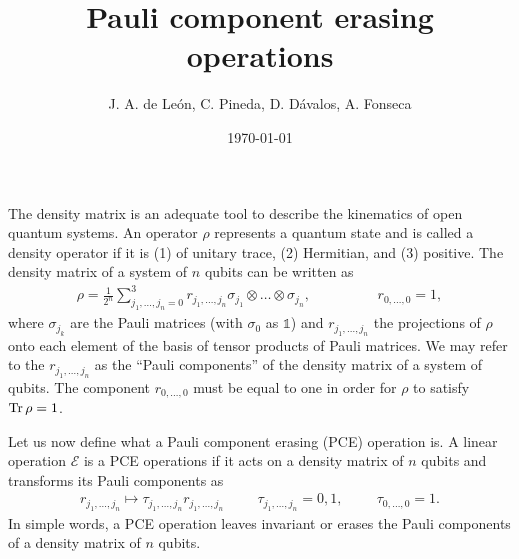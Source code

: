 \documentclass[11pt,dvipsnames]{article} %
\newcommand{\1}{\mathds{1}}
\begin{document}
\title{Pauli component erasing operations} 
\author{J. A. de León, C. Pineda, D. Dávalos, A. Fonseca}
\date{\today}  
\maketitle
{}

The density matrix is an adequate tool to describe the kinematics 
of open quantum systems. An operator $\rho$ represents a quantum state and
is called a density operator if it is (1) of unitary trace, (2) Hermitian, and 
(3) positive. The density matrix of a system of $n$ qubits can be written as 
\begin{align}\label{eq:rho_nQubits_pauliBasis}
\rho =\frac{1}{2^n} \sum_{j_1,\ldots,j_n=0}^3r_{j_1,\ldots,j_n}
\sigma_{j_1}\otimes \ldots \otimes \sigma_{j_n},
\hspace{2cm} r_{0,\ldots,0}=1,
\end{align}
where $\sigma_{j_k}$ are the Pauli matrices (with $\sigma_0$ as $\1$)
and $r_{j_1,\ldots,j_n}$ the projections of $\rho$ onto each element of 
the basis of tensor products of Pauli matrices. We may refer to the 
$r_{j_1,\ldots,j_n}$ as the ``Pauli components'' of the density matrix 
of a system of qubits.  The component $r_{0,\ldots,0}$
must be equal to one in order for $\rho$ to satisfy $\Tr \rho =1$. 

Let us now define what a Pauli component erasing (PCE) operation is. 
A linear operation $\mathcal{E}$ is a PCE operations if it 
acts on a density matrix of $n$ qubits and transforms its Pauli components as
\begin{align}\label{eq:PCE-definition}
r_{j_1,\ldots,j_n} \longmapsto \tau_{j_1,\ldots,j_n}r_{j_1,\ldots,j_n}
\hspace{1cm} \tau_{j_1,\ldots,j_n}=0,1,
\hspace{1cm} \tau_{0,\ldots,0}=1.
\end{align}
In simple words, a PCE operation leaves invariant or erases the Pauli 
components of a density matrix of $n$ qubits.
\end{document}
